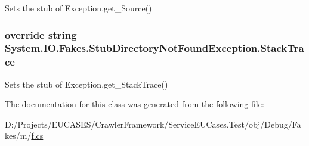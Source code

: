 Sets the stub of Exception.\-get\-\_\-\-Source()

\hypertarget{class_system_1_1_i_o_1_1_fakes_1_1_stub_directory_not_found_exception_ad9dd9d18a5db5e360c410e17289eaae3}{
\subsubsection[{Stack\-Trace}]{\setlength{\rightskip}{0pt plus 5cm}override string System.\-I\-O.\-Fakes.\-Stub\-Directory\-Not\-Found\-Exception.\-Stack\-Trace\hspace{0.3cm}{\ttfamily [get]}}}\label{class_system_1_1_i_o_1_1_fakes_1_1_stub_directory_not_found_exception_ad9dd9d18a5db5e360c410e17289eaae3}


Sets the stub of Exception.\-get\-\_\-\-Stack\-Trace()



The documentation for this class was generated from the following file\-:\begin{DoxyCompactItemize}
\item 
D\-:/\-Projects/\-E\-U\-C\-A\-S\-E\-S/\-Crawler\-Framework/\-Service\-E\-U\-Cases.\-Test/obj/\-Debug/\-Fakes/m/\hyperlink{m_2f_8cs}{f.\-cs}\end{DoxyCompactItemize}
